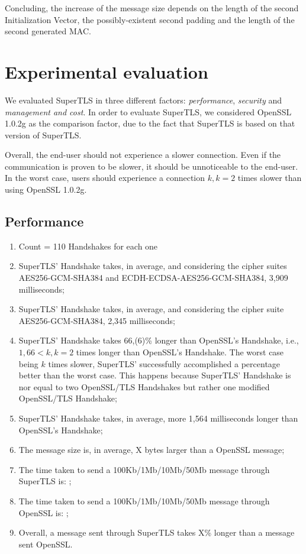 \documentclass{sig-alternate-05-2015}
\begin{document}
Concluding, the increase of the message size depends on the length of the second Initialization Vector, the possibly-existent second padding and the length of the second generated MAC.

\section{Experimental evaluation}

We evaluated SuperTLS in three different factors: \textit{performance}, \textit{security} and \textit{management and cost}.
In order to evaluate SuperTLS, we considered OpenSSL 1.0.2g as the comparison factor, due to the fact that SuperTLS is based on that version of SuperTLS.

Overall, the end-user should not experience a slower connection. Even if the communication is proven to be slower, it should be unnoticeable to the end-user. In the worst case, users should experience a connection $k, k = 2$ times slower than using OpenSSL 1.0.2g.

\subsection{Performance}

\begin{enumerate}
\item{Count = 110 Handshakes for each one}
\item{SuperTLS' Handshake takes, in average, and considering the cipher suites AES256-GCM-SHA384 and ECDH-ECDSA-AES256-GCM-SHA384, 3,909 milliseconds;}
\item{SuperTLS' Handshake takes, in average, and considering the cipher suite AES256-GCM-SHA384, 2,345 milliseconds;}
\item{SuperTLS' Handshake takes 66,(6)\% longer than OpenSSL's Handshake, i.e., $1,66 < k, k = 2$ times longer than OpenSSL's Handshake. The worst case being $k$ times slower, SuperTLS' successfully accomplished a percentage better than the worst case. This happens because SuperTLS' Handshake is nor equal to two OpenSSL/TLS Handshakes but rather one modified OpenSSL/TLS Handshake;}
\item{SuperTLS' Handshake takes, in average, more 1,564 milliseconds longer than OpenSSL's Handshake;}
\item{The message size is, in average, X bytes larger than a OpenSSL message;}
\item{The time taken to send a 100Kb/1Mb/10Mb/50Mb message through SuperTLS is: ;}
\item{The time taken to send a 100Kb/1Mb/10Mb/50Mb message through OpenSSL is: ;}
\item{Overall, a message sent through SuperTLS takes X\% longer than a message sent OpenSSL.}
\end{enumerate}
\end{document}
